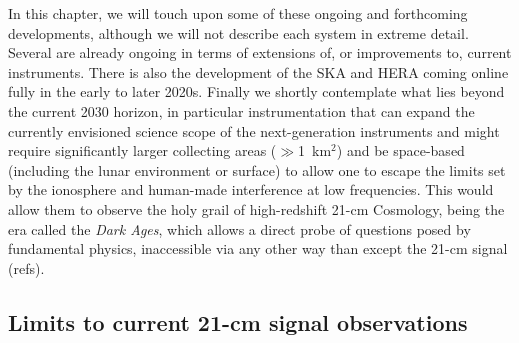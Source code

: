 %
In this chapter, we will touch upon some of these ongoing and forthcoming developments, although we will not describe each system in extreme detail. Several are already ongoing in terms of extensions of, or improvements to, current instruments. There is also the development of the SKA and HERA coming online fully in the early to later 2020s. Finally we shortly contemplate what lies beyond the current 2030 horizon, in particular instrumentation that can expand the currently envisioned science scope of the next-generation instruments and might require significantly larger collecting areas ($\gg$1~km$^2$) and be space-based (including the lunar environment or surface) to allow one to escape the limits set by the ionosphere and human-made interference at low frequencies. This would allow them to observe the holy grail of high-redshift 21-cm Cosmology, being the era called the {\sl Dark Ages}, which allows a direct probe of questions posed by fundamental physics, inaccessible via any other way than except the 21-cm signal (refs).



\subsection{Limits to current 21-cm signal observations}


